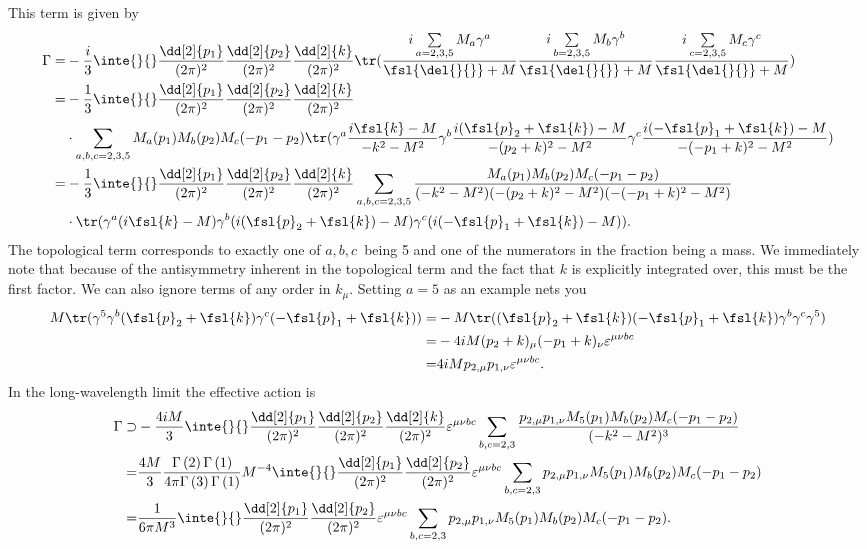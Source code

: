 This term is given by
\begin{align*}
	\Gamma =& -\frac{i}{3}\inte{}{}\frac{\dd[2]{p_{1}}}{(2\pi)^{2}}\frac{\dd[2]{p_{2}}}{(2\pi)^{2}}\frac{\dd[2]{k}}{(2\pi)^{2}}\tr(\frac{i\sum\limits_{a = 2, 3, 5}M_{a}\gamma^{a}}{\fsl{\del{}{}} + M}\frac{i\sum\limits_{b = 2, 3, 5}M_{b}\gamma^{b}}{\fsl{\del{}{}} + M}\frac{i\sum\limits_{c = 2, 3, 5}M_{c}\gamma^{c}}{\fsl{\del{}{}} + M}) \\
	       =& -\frac{1}{3}\inte{}{}\frac{\dd[2]{p_{1}}}{(2\pi)^{2}}\frac{\dd[2]{p_{2}}}{(2\pi)^{2}}\frac{\dd[2]{k}}{(2\pi)^{2}} \\
	        &\cdot\sum\limits_{a, b, c = 2, 3, 5}M_{a}(p_{1})M_{b}(p_{2})M_{c}(-p_{1} - p_{2})\tr(\gamma^{a}\frac{i\fsl{k} - M}{-k^{2} - M^{2}}\gamma^{b}\frac{i(\fsl{p}_{2} + \fsl{k}) - M}{-(p_{2} + k)^{2} - M^{2}}\gamma^{c}\frac{i(-\fsl{p}_{1} + \fsl{k}) - M}{-(-p_{1} + k)^{2} - M^{2}}) \\
	       =& -\frac{1}{3}\inte{}{}\frac{\dd[2]{p_{1}}}{(2\pi)^{2}}\frac{\dd[2]{p_{2}}}{(2\pi)^{2}}\frac{\dd[2]{k}}{(2\pi)^{2}}\sum\limits_{a, b, c = 2, 3, 5}\frac{M_{a}(p_{1})M_{b}(p_{2})M_{c}(-p_{1} - p_{2})}{(-k^{2} - M^{2})(-(p_{2} + k)^{2} - M^{2})(-(-p_{1} + k)^{2} - M^{2})} \\
	        &\cdot\tr(\gamma^{a}(i\fsl{k} - M)\gamma^{b}(i(\fsl{p}_{2} + \fsl{k}) - M)\gamma^{c}(i(-\fsl{p}_{1} + \fsl{k}) - M)).
\end{align*}
The topological term corresponds to exactly one of $a, b, c$ being 5 and one of the numerators in the fraction being a mass. We immediately note that because of the antisymmetry inherent in the topological term and the fact that $k$ is explicitly integrated over, this must be the first factor. We can also ignore terms of any order in $k_{\mu}$. Setting $a = 5$ as an example nets you
\begin{align*}
	  M\tr(\gamma^{5}\gamma^{b}(\fsl{p}_{2} + \fsl{k})\gamma^{c}(-\fsl{p}_{1} + \fsl{k})) =& -M\tr((\fsl{p}_{2} + \fsl{k})(-\fsl{p}_{1} + \fsl{k})\gamma^{b}\gamma^{c}\gamma^{5}) \\
	  =& -4iM(p_{2} + k)_{\mu}(-p_{1} + k)_{\nu}\varepsilon^{\mu\nu bc} \\
	  =& 4iMp_{2, \mu}p_{1, \nu}\varepsilon^{\mu\nu bc}.
\end{align*}
In the long-wavelength limit the effective action is
\begin{align*}
	\Gamma \supset& -\frac{4iM}{3}\inte{}{}\frac{\dd[2]{p_{1}}}{(2\pi)^{2}}\frac{\dd[2]{p_{2}}}{(2\pi)^{2}}\frac{\dd[2]{k}}{(2\pi)^{2}}\varepsilon^{\mu\nu bc}\sum\limits_{b, c = 2, 3}\frac{p_{2, \mu}p_{1, \nu}M_{5}(p_{1})M_{b}(p_{2})M_{c}(-p_{1} - p_{2})}{(-k^{2} - M^{2})^{3}} \\
	             =& \frac{4M}{3}\frac{\Gamma\left(2\right)\Gamma\left(1\right)}{4\pi\Gamma\left(3\right)\Gamma\left(1\right)}M^{-4}\inte{}{}\frac{\dd[2]{p_{1}}}{(2\pi)^{2}}\frac{\dd[2]{p_{2}}}{(2\pi)^{2}}\varepsilon^{\mu\nu bc}\sum\limits_{b, c = 2, 3}p_{2, \mu}p_{1, \nu}M_{5}(p_{1})M_{b}(p_{2})M_{c}(-p_{1} - p_{2}) \\
	             =& \frac{1}{6\pi M^{3}}\inte{}{}\frac{\dd[2]{p_{1}}}{(2\pi)^{2}}\frac{\dd[2]{p_{2}}}{(2\pi)^{2}}\varepsilon^{\mu\nu bc}\sum\limits_{b, c = 2, 3}p_{2, \mu}p_{1, \nu}M_{5}(p_{1})M_{b}(p_{2})M_{c}(-p_{1} - p_{2}).
\end{align*}
